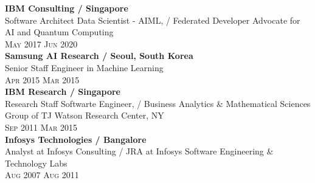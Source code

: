 \documentclass[oneside,a4,10pt]{article} %
\begin{document}
{\begin{minipage}[t][\dimexpr\textheight-2\fboxrule-2\fboxsep\relax][t]{\dimexpr0.6\textwidth-2\fboxrule-2\fboxsep\relax}
        {\large \textbf{IBM Consulting / Singapore}}\\
        {{\selectfont Software Architect Data Scientist - AIML, / Federated Developer Advocate for AI and Quantum Computing}}\\
        {\scshape{}\selectfont\footnotesize May 2017 \textendash{} Jun 2020} \\

        {\large \textbf{Samsung AI Research / Seoul, South Korea}}\\
        {{\selectfont Senior Staff Engineer in Machine Learning }}\\
        {\scshape{}\selectfont\footnotesize Apr 2015 \textendash{} Mar 2015} \\
        {\large \textbf{IBM Research / Singapore}}\\
        {{\selectfont Research Staff Softwarte Engineer, / Business Analytics \& Mathematical Sciences Group of TJ Watson Research Center, NY}}\\
        {\scshape{}\selectfont\footnotesize Sep 2011 \textendash{} Mar 2015} \\

%
        {\large \textbf{Infosys Technologies / Bangalore}}\\
        {{\selectfont Analyst at Infosys Consulting / JRA at Infosys Software Engineering \& Technology Labs}}\\
        {\scshape{}\selectfont\footnotesize Aug 2007 \textendash{} Aug 2011} \\


\end{minipage}}
\end{document}

